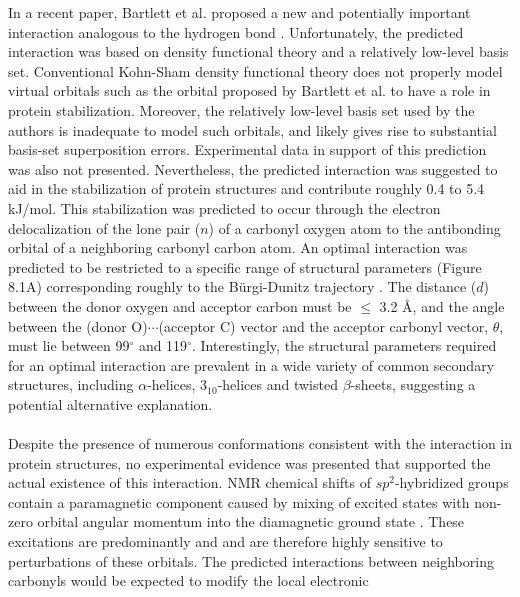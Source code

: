 \begin{doublespace}
In a recent paper, Bartlett et al. proposed a new and potentially
important interaction analogous to the hydrogen bond
\cite{bartlett:ncb2010}. Unfortunately, the predicted \npistar{}
interaction was based on density functional theory and a relatively low-level
basis set. Conventional Kohn-Sham density functional theory does not properly
model virtual orbitals  \cite{mera:physrev2009} such as the \pistar{}
orbital proposed by Bartlett et al. to have a role in protein stabilization.
Moreover, the relatively low-level basis set used by the authors is inadequate
to model such orbitals, and likely gives rise to substantial basis-set
superposition errors. Experimental data in support of this prediction was also
not presented. Nevertheless, the predicted \npistar{} interaction was suggested
to aid in the stabilization of protein structures and contribute roughly 0.4
to 5.4 kJ/mol. This stabilization was predicted to occur through the electron
delocalization of the lone pair ($n$) of a carbonyl oxygen atom to the
antibonding \pistar{} orbital of a neighboring carbonyl carbon atom. An
optimal \npistar{} interaction was predicted to be restricted to a specific
range of structural parameters (Figure 8.1A) corresponding roughly to the
B\"{u}rgi-Dunitz trajectory \cite{burgi:jacs1973}.
The distance ($d$) between the donor oxygen and acceptor
carbon must be $\leq$ 3.2 \r{A}, and the angle between the
(donor O)$\cdots$(acceptor C) vector and the acceptor carbonyl vector,
$\theta$, must lie between 99$^\circ$ and 119$^\circ$. Interestingly, the
structural parameters required for an optimal \npistar{} interaction are
prevalent in a wide variety of common secondary structures, including
$\alpha$-helices, $3_{10}$-helices and twisted $\beta$-sheets, suggesting
a potential alternative explanation.
\\\\
Despite the presence of numerous conformations consistent with the \npistar{}
interaction in protein structures, no experimental evidence was presented
that supported the actual existence of this interaction. NMR chemical shifts of
$sp^2$-hybridized groups contain a paramagnetic component caused by mixing of
excited states with non-zero orbital angular momentum into the diamagnetic
ground state \cite{ramsey:physrev1950}. These excitations are
predominantly \npistar{} and \pipistar{} and are therefore highly sensitive to
perturbations of these orbitals. The predicted \npistar{} interactions between
neighboring carbonyls would be expected to modify the local electronic

\end{doublespace}
